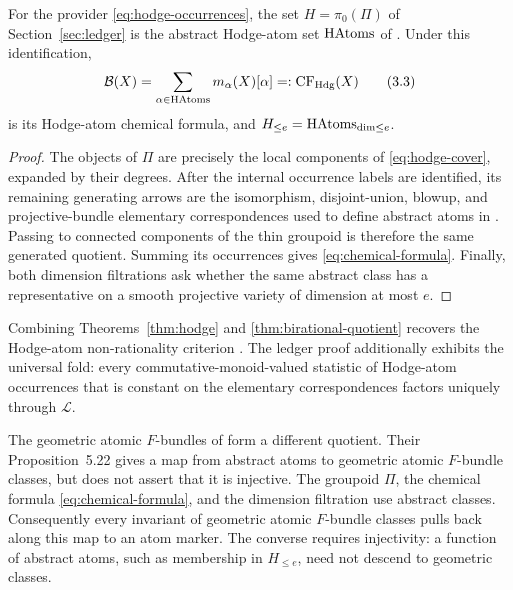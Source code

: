 \begin{theorem}
\label{thm:hodge}
For the provider \eqref{eq:hodge-occurrences}, the set
\(H=\pi_0(\Pi)\) of Section~\ref{sec:ledger} is the abstract Hodge-atom set
\(\operatorname{HAtoms}\) of \cite[Definition~5.16 and Section~5.4]{KKPY}.  Under this
identification,
\[
 \mathcal B(X)=\sum_{\alpha\in\operatorname{HAtoms}}m_\alpha(X)[\alpha]
 =:\operatorname{CF}_{\mathrm{Hdg}}(X)
 \tag{3.3}\label{eq:chemical-formula}
\]
is its Hodge-atom chemical formula, and
\(H_{\le e}=\operatorname{HAtoms}_{\dim\le e}\).
\end{theorem}

\begin{proof}
The objects of \(\Pi\) are precisely the local components of
\eqref{eq:hodge-cover}, expanded by their degrees.  After the internal
occurrence labels are identified, its remaining generating arrows are the
isomorphism, disjoint-union, blowup, and projective-bundle elementary
correspondences used to define abstract atoms in
\cite[Sections~5.2.3--5.2.6]{KKPY}.  Passing to connected components of the
thin groupoid is therefore the same generated quotient.  Summing its
occurrences gives \eqref{eq:chemical-formula}.  Finally, both dimension
filtrations ask whether the same abstract class has a representative on a
smooth projective variety of dimension at most $e$.
\end{proof}

Combining Theorems~\ref{thm:hodge} and
\ref{thm:birational-quotient} recovers the Hodge-atom non-rationality
criterion \cite[Proposition~5.30]{KKPY}.  The ledger proof additionally
exhibits the universal fold: every commutative-monoid-valued statistic of
Hodge-atom occurrences that is constant on the elementary correspondences
factors uniquely through \(\mathcal L\).

\begin{remark}
\label{rem:two-quotients}
The geometric atomic $F$-bundles of \cite[Definition~5.21]{KKPY} form a
different quotient.  Their Proposition~5.22 gives a map from abstract atoms
to geometric atomic $F$-bundle classes, but does not assert that it is
injective.  The groupoid \(\Pi\), the chemical formula
\eqref{eq:chemical-formula}, and the dimension filtration use abstract
classes.  Consequently every invariant of geometric atomic $F$-bundle classes
pulls back along this map to an atom marker.  The converse requires
injectivity: a function of abstract atoms, such as membership in
$H_{\le e}$, need not descend to geometric classes.
\end{remark}
